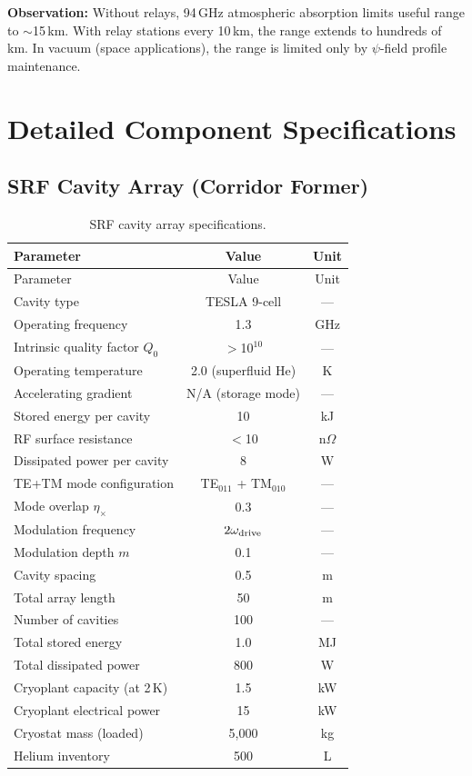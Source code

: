\documentclass[11pt,a4paper]{article}
\begin{document}
\textbf{Observation:} Without relays, 94\,GHz atmospheric absorption
limits useful range to $\sim$15\,km. With relay stations every 10\,km,
the range extends to hundreds of km. In vacuum (space applications),
the range is limited only by $\psi$-field profile maintenance.

\section{Detailed Component Specifications}

\subsection{SRF Cavity Array (Corridor Former)}

\begin{longtable}{lcc}
\caption{SRF cavity array specifications.} \\
\toprule
Parameter & Value & Unit \\
\midrule
\endfirsthead
\toprule
Parameter & Value & Unit \\
\midrule
\endhead
\bottomrule
\endlastfoot
Cavity type & TESLA 9-cell & --- \\
Operating frequency & 1.3 & GHz \\
Intrinsic quality factor $Q_0$ & $>$10$^{10}$ & --- \\
Operating temperature & 2.0 (superfluid He) & K \\
Accelerating gradient & N/A (storage mode) & --- \\
Stored energy per cavity & 10 & kJ \\
RF surface resistance & $<$10 & n$\Omega$ \\
Dissipated power per cavity & 8 & W \\
TE+TM mode configuration & TE$_{011}$ + TM$_{010}$ & --- \\
Mode overlap $\eta_\times$ & 0.3 & --- \\
Modulation frequency & $2\omega_{\rm drive}$ & --- \\
Modulation depth $m$ & 0.1 & --- \\
Cavity spacing & 0.5 & m \\
Total array length & 50 & m \\
Number of cavities & 100 & --- \\
Total stored energy & 1.0 & MJ \\
Total dissipated power & 800 & W \\
Cryoplant capacity (at 2\,K) & 1.5 & kW \\
Cryoplant electrical power & 15 & kW \\
Cryostat mass (loaded) & 5{,}000 & kg \\
Helium inventory & 500 & L \\
\end{longtable}
\end{document}
